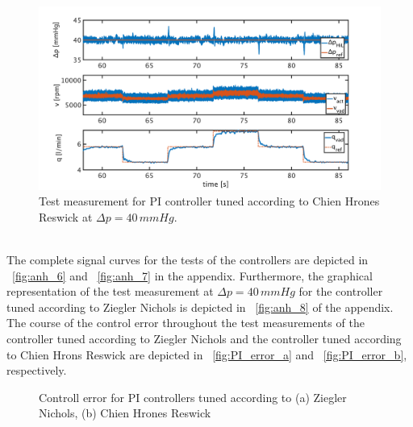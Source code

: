 \begin{figure}[ht]
  \centering
  \includegraphics[width=\textwidth]{images/chapt_5/pi_contr_chr_40.pdf}
  \caption[Test measurement for PI controller tuned according to Chien Hrones Reswick at $\Delta{p}=40\,mmHg$]{Test measurement for PI controller tuned according to Chien Hrones Reswick at $\Delta{p}=40\,mmHg$.}
  \label{fig:pi_contr_chr_40}
\end{figure}
\\The complete signal curves for the tests of the controllers are depicted in \figurename~\ref{fig:anh_6} and \figurename~\ref{fig:anh_7} in the appendix. Furthermore, the graphical representation of the test measurement at $\Delta{p}=40\,mmHg$ for the controller tuned according to Ziegler Nichols is depicted in \figurename~\ref{fig:anh_8} of the appendix.
\\The course of the control error throughout the test measurements of the controller tuned according to Ziegler Nichols and the controller tuned according to Chien Hrons Reswick are depicted in \figurename~\ref{fig:PI_error_a} and \figurename~\ref{fig:PI_error_b}, respectively.
\begin{figure}[ht]
  \centering
  \caption[Controll error for PI Controllers]{Controll error for PI controllers tuned according to (a) Ziegler Nichols, (b) Chien Hrones Reswick}
  \label{fig:PI_error}
\end{figure}
